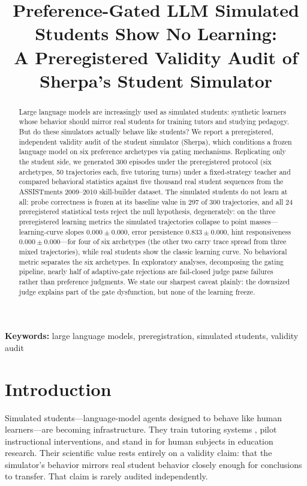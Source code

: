 \documentclass[12pt,a4paper]{article}
\title{\sffamily\bfseries\Large Preference-Gated LLM Simulated Students Show No Learning:\\A Preregistered Validity Audit of Sherpa's Student Simulator}
\author{}   %
\date{}
\begin{document}
\maketitle
\thispagestyle{plain}
\setcounter{page}{1}

\begin{abstract}
\noindent Large language models are increasingly used as simulated students:
synthetic learners whose behavior should mirror real students for training
tutors and studying pedagogy. But do these simulators actually behave like
students? We report a preregistered, independent validity audit of the student
simulator (Sherpa), which conditions a frozen language model on six
preference archetypes via gating mechanisms. Replicating only the student
side, we generated 300 episodes under the preregistered protocol (six archetypes, 50
trajectories each, five tutoring turns) under a fixed-strategy teacher and
compared behavioral statistics against five thousand real student sequences
from the ASSISTments 2009--2010 skill-builder dataset. The simulated students
do not learn at all: probe correctness is frozen at its baseline value in 297
of 300 trajectories, and all 24 preregistered statistical tests reject the
null hypothesis, degenerately: on the three preregistered learning metrics the
simulated trajectories collapse to point masses---learning-curve slopes
$0.000 \pm 0.000$, error persistence $0.833 \pm 0.000$, hint responsiveness
$0.000 \pm 0.000$---for four of six archetypes (the other two carry trace
spread from three mixed trajectories), while real students show the classic
learning curve. No behavioral metric separates the six archetypes. In
exploratory analyses, decomposing the gating pipeline,
nearly half of adaptive-gate rejections are fail-closed judge parse failures
rather than preference judgments. We state our sharpest caveat plainly: the downsized
judge explains part of the gate dysfunction, but none of the learning freeze.
\end{abstract}

\noindent\textbf{Keywords:} large language models, preregistration, simulated students, validity audit

\section{Introduction}

Simulated students---language-model agents designed to behave like human
learners---are becoming infrastructure. They train tutoring systems
\citep{xu2026sherpa}, pilot instructional interventions, and stand in for
human subjects in education research. Their scientific value rests entirely
on a validity claim: that the simulator's behavior mirrors real student
behavior closely enough for conclusions to transfer. That claim is rarely
audited independently.
\end{document}
